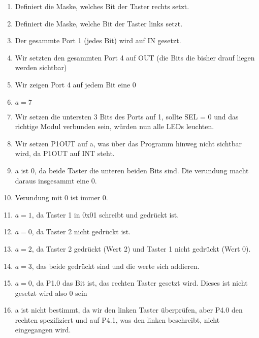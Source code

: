 \begin{description}
\begin{enumerate}

\item Definiert die Maske, welches Bit der Taster rechts setzt.

\item Definiert die Maske, welche Bit der Taster links setzt.

\item Der gesammte Port 1 (jedes Bit) wird auf IN gesetzt.

\item Wir setzten den gesammten Port 4 auf OUT (die Bits die bisher drauf liegen werden sichtbar)

\item Wir zeigen Port 4 auf jedem Bit eine 0

\item $a = 7$

\item Wir setzen die untersten 3 Bits des Ports auf 1, sollte SEL = 0 und das richtige Modul verbunden sein, würden nun alle LEDs leuchten.

\item Wir setzen P1OUT auf a, was über das Programm hinweg nicht sichtbar wird, da P1OUT auf INT steht.

\item a ist 0, da beide Taster die unteren beiden Bits sind. Die verundung macht daraus insgesammt eine 0.

\item Verundung mit 0 ist immer 0.

\item $a = 1$, da Taster 1 in 0x01 schreibt und gedrückt ist.

\item $a = 0$, da Taster 2 nicht gedrückt ist.

\item $a = 2$, da Taster 2 gedrückt (Wert 2) und Taster 1 nicht gedrückt (Wert 0).

\item $a = 3$, das beide gedrückt sind und die werte sich addieren.

\item $a = 0$, da P1.0 das Bit ist, das rechten Taster gesetzt wird. Dieses ist nicht gesetzt wird also 0 sein

\item a ist nicht bestimmt, da wir den linken Taster überprüfen, aber P4.0 den rechten spezifiziert und auf P4.1, was den linken beschreibt, nicht eingegangen wird.


\end{enumerate}
\end{description}
